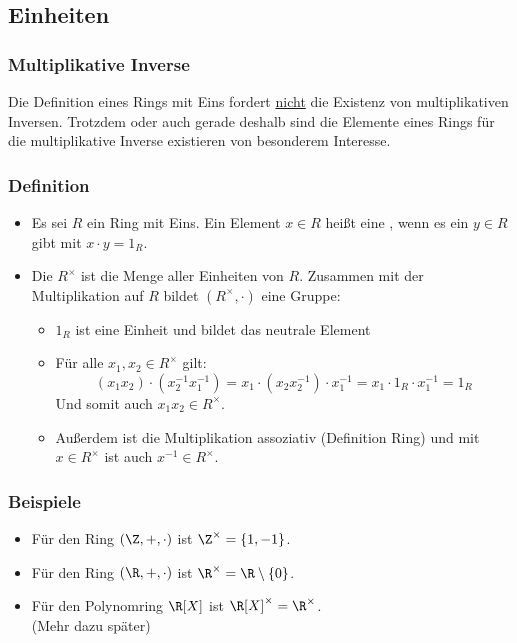 \subsection{Einheiten}
%
\begin{frame}\frametitle{Multiplikative Inverse}
Die Definition eines Rings mit Eins fordert \underline{nicht} die Existenz von multiplikativen Inversen. Trotzdem oder auch gerade deshalb sind die Elemente eines Rings für die multiplikative Inverse existieren von besonderem Interesse.
\end{frame}
%
%
\begin{frame}\frametitle{Definition}
\begin{itemize}
\item Es sei $R$ ein Ring mit Eins. Ein Element $x \in R$ heißt eine , wenn es ein $y \in R$ gibt mit $x\cdot y = 1_R$. \pause
\item Die  $R^\times$ ist die Menge aller Einheiten von $R$. Zusammen mit der Multiplikation auf $R$ bildet $(R^\times, \cdot)$ eine Gruppe: \pause
	\begin{itemize}
	\item $1_R$ ist eine Einheit und bildet das neutrale Element\pause
	\item Für alle $x_1,x_2 \in R^\times$ gilt: 
	$$(x_1x_2)\cdot(x_2^{-1}x_1^{-1})=x_1\cdot(x_2x_2^{-1})\cdot x_1^{-1}=x_1\cdot 1_R \cdot x_1^{-1}=1_R$$
	Und somit auch $x_1x_2 \in R^\times$.\pause
	\item Außerdem ist die Multiplikation assoziativ (Definition Ring) und mit $x\in R^\times$ ist auch $x^{-1} \in R^\times$.
	\end{itemize}
\end{itemize}


\end{frame}
%
%
\begin{frame}\frametitle{Beispiele}
\begin{itemize}
\item Für den Ring $(\Z,+,\cdot)$ ist $\Z^\times = \{1,-1\}$.\pause \vfill
\item Für den Ring $(\R,+,\cdot)$ ist $\R^\times = \R \setminus \{0\}$.\pause \vfill
\item Für den Polynomring $\R[X]$ ist $\R[X]^\times = \R^\times$.\\ (Mehr dazu später)
\end{itemize}
\end{frame}
%
